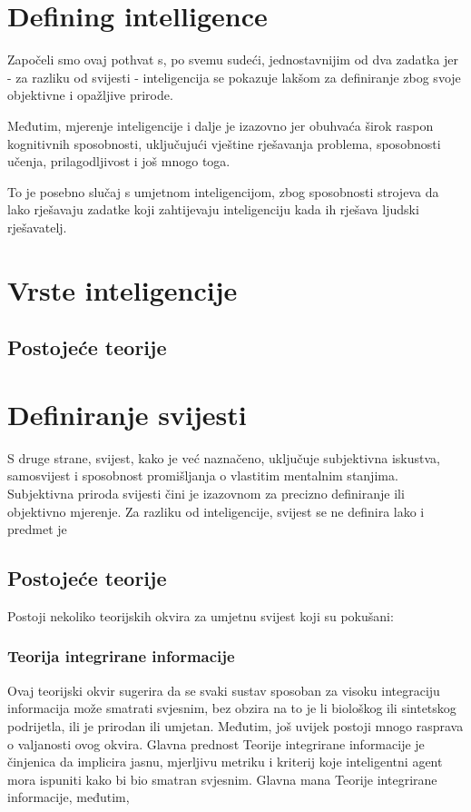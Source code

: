 \documentclass[diplomskirad]{fer}
\begin{document}
\section{Defining intelligence}
Započeli smo ovaj pothvat s, po svemu sudeći, jednostavnijim od dva zadatka jer - za razliku od svijesti - inteligencija se pokazuje lakšom za definiranje zbog svoje objektivne i opažljive prirode.

Međutim, mjerenje inteligencije i dalje je izazovno jer obuhvaća širok raspon kognitivnih sposobnosti, uključujući vještine rješavanja problema, sposobnosti učenja, prilagodljivost i još mnogo toga.

To je posebno slučaj s umjetnom inteligencijom, zbog sposobnosti strojeva da lako rješavaju zadatke koji zahtijevaju inteligenciju kada ih rješava ljudski rješavatelj.
\section{Vrste inteligencije}
\subsection{Postojeće teorije}
\section{Definiranje svijesti}
S druge strane, svijest, kako je već naznačeno, uključuje subjektivna iskustva, samosvijest i sposobnost promišljanja o vlastitim mentalnim stanjima. Subjektivna priroda svijesti čini je izazovnom za precizno definiranje ili objektivno mjerenje.
Za razliku od inteligencije, svijest se ne definira lako i predmet je
\subsection{Postojeće teorije}
Postoji nekoliko teorijskih okvira za umjetnu svijest koji su pokušani:
\subsubsection{Teorija integrirane informacije}
Ovaj teorijski okvir sugerira da se svaki sustav sposoban za visoku integraciju informacija može smatrati svjesnim, bez obzira na to je li biološkog ili sintetskog podrijetla, ili je prirodan ili umjetan. Međutim, još uvijek postoji mnogo rasprava o valjanosti ovog okvira.
Glavna prednost Teorije integrirane informacije je činjenica da implicira jasnu, mjerljivu metriku i kriterij koje inteligentni agent mora ispuniti kako bi bio smatran svjesnim.
Glavna mana Teorije integrirane informacije, međutim,
\end{document}
